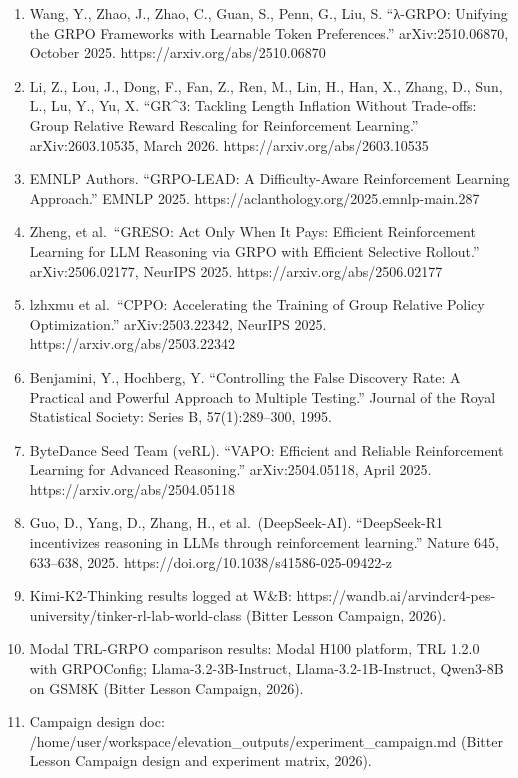 \documentclass[
  american,
  11pt,
  a4paper,
  oneside]{report}
\begin{document}
\begin{enumerate}
  Le, T.-L. V., Jeon, M., Vu, K., Lai, V., Yang, E. ``No Prompt Left
  Behind: Exploiting Zero-Variance Prompts in LLM Reinforcement Learning
  (RL-ZVP).'' arXiv:2509.21880, September 2025.
  https://arxiv.org/abs/2509.21880
\item
  Wang, Y., Zhao, J., Zhao, C., Guan, S., Penn, G., Liu, S. ``λ-GRPO:
  Unifying the GRPO Frameworks with Learnable Token Preferences.''
  arXiv:2510.06870, October 2025. https://arxiv.org/abs/2510.06870
\item
  Li, Z., Lou, J., Dong, F., Fan, Z., Ren, M., Lin, H., Han, X., Zhang,
  D., Sun, L., Lu, Y., Yu, X. ``GR\^{}3: Tackling Length Inflation
  Without Trade-offs: Group Relative Reward Rescaling for Reinforcement
  Learning.'' arXiv:2603.10535, March 2026.
  https://arxiv.org/abs/2603.10535
\item
  EMNLP Authors. ``GRPO-LEAD: A Difficulty-Aware Reinforcement Learning
  Approach.'' EMNLP 2025. https://aclanthology.org/2025.emnlp-main.287
\item
  Zheng, et al.~``GRESO: Act Only When It Pays: Efficient Reinforcement
  Learning for LLM Reasoning via GRPO with Efficient Selective
  Rollout.'' arXiv:2506.02177, NeurIPS 2025.
  https://arxiv.org/abs/2506.02177
\item
  lzhxmu et al.~``CPPO: Accelerating the Training of Group Relative
  Policy Optimization.'' arXiv:2503.22342, NeurIPS 2025.
  https://arxiv.org/abs/2503.22342
\item
  Benjamini, Y., Hochberg, Y. ``Controlling the False Discovery Rate: A
  Practical and Powerful Approach to Multiple Testing.'' Journal of the
  Royal Statistical Society: Series B, 57(1):289--300, 1995.
\item
  ByteDance Seed Team (veRL). ``VAPO: Efficient and Reliable
  Reinforcement Learning for Advanced Reasoning.'' arXiv:2504.05118,
  April 2025. https://arxiv.org/abs/2504.05118
\item
  Guo, D., Yang, D., Zhang, H., et al.~(DeepSeek-AI). ``DeepSeek-R1
  incentivizes reasoning in LLMs through reinforcement learning.''
  Nature 645, 633--638, 2025. https://doi.org/10.1038/s41586-025-09422-z
\item
  Kimi-K2-Thinking results logged at W\&B:
  https://wandb.ai/arvindcr4-pes-university/tinker-rl-lab-world-class
  (Bitter Lesson Campaign, 2026).
\item
  Modal TRL-GRPO comparison results: Modal H100 platform, TRL 1.2.0 with
  GRPOConfig; Llama-3.2-3B-Instruct, Llama-3.2-1B-Instruct, Qwen3-8B on
  GSM8K (Bitter Lesson Campaign, 2026).
\item
  Campaign design doc:
  /home/user/workspace/elevation\_outputs/experiment\_campaign.md
  (Bitter Lesson Campaign design and experiment matrix, 2026).
\end{enumerate}
\end{document}
